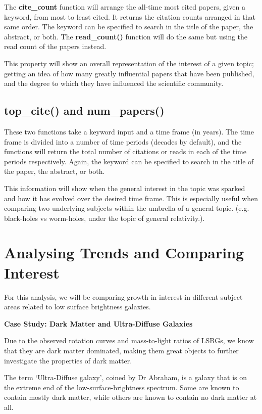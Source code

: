 \documentclass[10pt, letterpaper]{article}
\begin{document}
The \textbf{cite\_count} function will arrange the all-time most cited papers, given a keyword, from most to least cited. It returns the citation counts arranged in that same order. The keyword can be specified to search in the title of the paper, the abstract, or both. The \textbf{read\_count()} function will do the same but using the read count of the papers instead.

This property will show an overall representation of the interest of a given topic; getting an idea of how many greatly influential papers that have been published, and the degree to which they have influenced the scientific community.

\subsection{top\_cite() and num\_papers()}

These two functions take a keyword input and a time frame (in years). The time frame is divided into a number of time periods (decades by default), and the functions will return the total number of citations or reads in each of the time periods respectively. Again, the keyword can be specified to search in the title of the paper, the abstract, or both.

This information will show when the general interest in the topic was sparked and how it has evolved over the desired time frame. This is especially useful when comparing two underlying subjects within the umbrella of a general topic. (e.g. black-holes vs worm-holes, under the topic of general relativity.).


\section{Analysing Trends and Comparing Interest}

For this analysis, we will be comparing growth in interest in different subject areas related to low surface brightness galaxies.

\vspace{1cm}
\textbf{Case Study: Dark Matter and Ultra-Diffuse Galaxies}
\vspace{1cm}

Due to the observed rotation curves and mass-to-light ratios of LSBGs, we know that they are dark matter dominated, making them great objects to further investigate the properties of dark matter. 

The term `Ultra-Diffuse galaxy', coined by Dr Abraham, is a galaxy that is on the extreme end of the low-surface-brightness spectrum. Some are known to contain mostly dark matter, while others are known to contain no dark matter at all.
\end{document}
